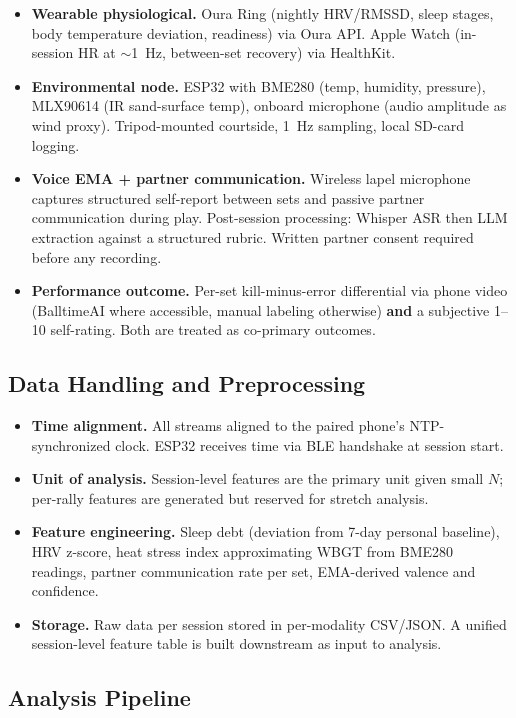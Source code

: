 \documentclass[sigconf,nonacm]{acmart}
\begin{document}
\begin{itemize}
    \item \textbf{Wearable physiological.} Oura Ring (nightly HRV/RMSSD, sleep stages, body temperature deviation, readiness) via Oura API. Apple Watch (in-session HR at $\sim$1~Hz, between-set recovery) via HealthKit.
    \item \textbf{Environmental node.} ESP32 with BME280 (temp, humidity, pressure), MLX90614 (IR sand-surface temp), onboard microphone (audio amplitude as wind proxy). Tripod-mounted courtside, 1~Hz sampling, local SD-card logging.
    \item \textbf{Voice EMA + partner communication.} Wireless lapel microphone captures structured self-report between sets and passive partner communication during play. Post-session processing: Whisper ASR then LLM extraction against a structured rubric. Written partner consent required before any recording.
    \item \textbf{Performance outcome.} Per-set kill-minus-error differential via phone video (BalltimeAI where accessible, manual labeling otherwise) \textbf{and} a subjective 1--10 self-rating. Both are treated as co-primary outcomes.
\end{itemize}

\subsection{Data Handling and Preprocessing}

\begin{itemize}
    \item \textbf{Time alignment.} All streams aligned to the paired phone's NTP-synchronized clock. ESP32 receives time via BLE handshake at session start.
    \item \textbf{Unit of analysis.} Session-level features are the primary unit given small $N$; per-rally features are generated but reserved for stretch analysis.
    \item \textbf{Feature engineering.} Sleep debt (deviation from 7-day personal baseline), HRV z-score, heat stress index approximating WBGT from BME280 readings, partner communication rate per set, EMA-derived valence and confidence.
    \item \textbf{Storage.} Raw data per session stored in per-modality CSV/JSON. A unified session-level feature table is built downstream as input to analysis.
\end{itemize}

\subsection{Analysis Pipeline}
\end{document}
